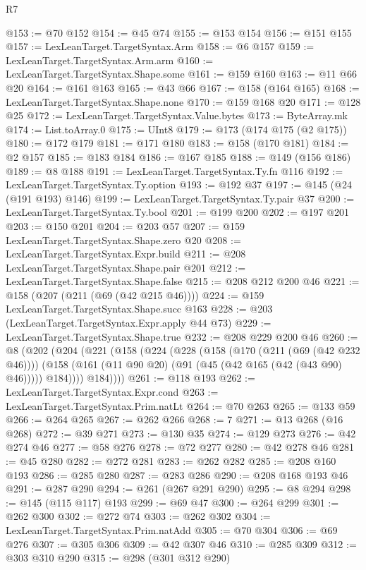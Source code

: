 \begin{lexlean}{R7}
\begin{coremodule}
@153 := @70 @152
@154 := @45 @74
@155 := @153 @154
@156 := @151 @155
@157 := LexLeanTarget.TargetSyntax.Arm
@158 := @6 @157
@159 := LexLeanTarget.TargetSyntax.Arm.arm
@160 := LexLeanTarget.TargetSyntax.Shape.some
@161 := @159 @160
@163 := @11 @66 @20
@164 := @161 @163
@165 := @43 @66
@167 := @158 (@164 @165)
@168 := LexLeanTarget.TargetSyntax.Shape.none
@170 := @159 @168 @20
@171 := @128 @25
@172 := LexLeanTarget.TargetSyntax.Value.bytes
@173 := ByteArray.mk
@174 := List.toArray.{0}
@175 := UInt8
@179 := @173 (@174 @175 (@2 @175))
@180 := @172 @179
@181 := @171 @180
@183 := @158 (@170 @181)
@184 := @2 @157
@185 := @183 @184
@186 := @167 @185
@188 := @149 (@156 @186)
@189 := @8 @188
@191 := LexLeanTarget.TargetSyntax.Ty.fn @116
@192 := LexLeanTarget.TargetSyntax.Ty.option
@193 := @192 @37
@197 := @145 (@24 (@191 @193) @146)
@199 := LexLeanTarget.TargetSyntax.Ty.pair @37
@200 := LexLeanTarget.TargetSyntax.Ty.bool
@201 := @199 @200
@202 := @197 @201
@203 := @150 @201
@204 := @203 @57
@207 := @159 LexLeanTarget.TargetSyntax.Shape.zero @20
@208 := LexLeanTarget.TargetSyntax.Expr.build
@211 := @208 LexLeanTarget.TargetSyntax.Shape.pair @201
@212 := LexLeanTarget.TargetSyntax.Shape.false
@215 := @208 @212 @200 @46
@221 := @158 (@207 (@211 (@69 (@42 @215 @46))))
@224 := @159 LexLeanTarget.TargetSyntax.Shape.succ @163
@228 := @203 (LexLeanTarget.TargetSyntax.Expr.apply @44 @73)
@229 := LexLeanTarget.TargetSyntax.Shape.true
@232 := @208 @229 @200 @46
@260 := @8
    (@202
      (@204
        (@221
          (@158
            (@224
              (@228
                (@158
                  (@170 (@211 (@69 (@42 @232 @46))))
                  (@158 (@161 (@11 @90 @20) (@91 (@45 (@42 @165 (@42 (@43 @90) @46))))) @184))))
            @184))))
@261 := @118 @193
@262 := LexLeanTarget.TargetSyntax.Expr.cond
@263 := LexLeanTarget.TargetSyntax.Prim.natLt
@264 := @70 @263
@265 := @133 @59
@266 := @264 @265
@267 := @262 @266
@268 := 7
@271 := @13 @268 (@16 @268)
@272 := @39 @271
@273 := @130 @35
@274 := @129 @273
@276 := @42 @274 @46
@277 := @58 @276
@278 := @72 @277
@280 := @42 @278 @46
@281 := @45 @280
@282 := @272 @281
@283 := @262 @282
@285 := @208 @160 @193
@286 := @285 @280
@287 := @283 @286
@290 := @208 @168 @193 @46
@291 := @287 @290
@294 := @261 (@267 @291 @290)
@295 := @8 @294
@298 := @145 (@115 @117) @193
@299 := @69 @47
@300 := @264 @299
@301 := @262 @300
@302 := @272 @74
@303 := @262 @302
@304 := LexLeanTarget.TargetSyntax.Prim.natAdd
@305 := @70 @304
@306 := @69 @276
@307 := @305 @306
@309 := @42 @307 @46
@310 := @285 @309
@312 := @303 @310 @290
@315 := @298 (@301 @312 @290)

\end{coremodule}
\end{lexlean}
